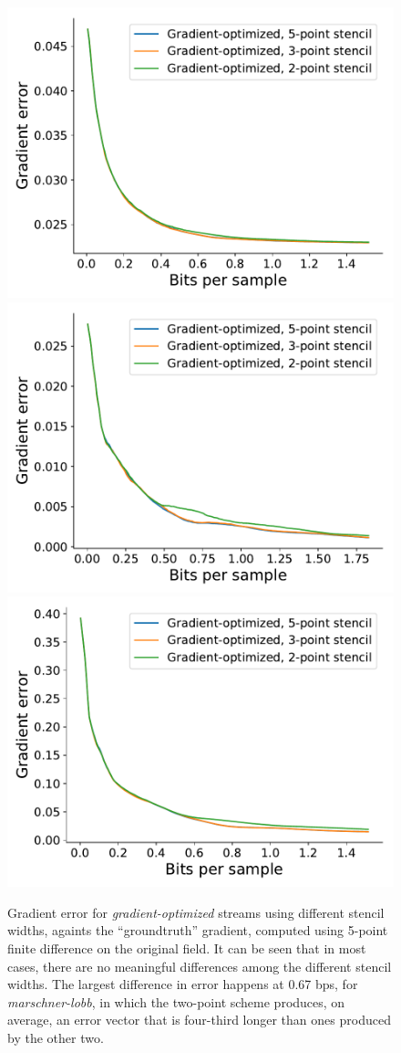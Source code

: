\begin{figure}
	{\includegraphics[width=0.48\linewidth]{img/gradient/compare-stencils/gradient-optimized-pressure.pdf}}
	{\includegraphics[width=0.48\linewidth]{img/gradient/compare-stencils/gradient-optimized-marschner-lobb.pdf}}
	{\includegraphics[width=0.48\linewidth]{img/gradient/compare-stencils/gradient-optimized-velocityz.pdf}}
	\caption{Gradient error for \emph{gradient-optimized} streams using different stencil widths,
	againts the ``groundtruth'' gradient, computed using 5-point finite difference on the original
	field. It can be seen that in most cases, there are no meaningful differences among the different
	stencil widths. The largest difference in error happens at 0.67 bps, for \emph{marschner-lobb}, in
	which the two-point scheme produces, on average, an error vector that is four-third longer than
	ones produced by the other two.}
	\label{fig:gradient-error-comparison}
\end{figure}

